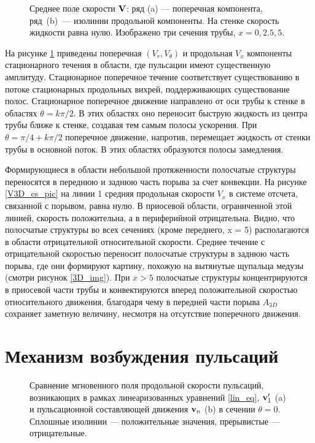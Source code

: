 \begin{figure}[h]
\caption{Среднее поле скорости $\mathbf{V}$: ряд (a) --- поперечная компонента, ряд~(b)~--- изолинии продольной компоненты. На стенке скорость жидкости равна нулю. Изображено три сечения трубы, $x = 0, 2.5, 5$.}
\label{VEL_cs_pic}
\end{figure}

На рисунке \ref{VEL_cs_pic} приведены поперечная $(V_r, V_\theta)$ и продольная $V_x$ компоненты стационарного течения в области, где пульсации имеют существенную амплитуду. Стационарное поперечное течение соответствует существованию в потоке стационарных продольных вихрей, поддерживающих существование полос. Стационарное поперечное движение направлено от оси трубы к стенке в областях $\theta=k\pi/2$. В этих областях оно переносит быструю жидкость из центра трубы ближе к стенке, создавая тем самым полосы ускорения. При $\theta=\pi/4+k\pi/2$ поперечное движение, напротив, перемещает жидкость от стенки трубы в основной поток. В этих областях образуются полосы замедления. 

Формирующиеся в области небольшой протяженности полосчатые структуры переносятся в переднюю и заднюю часть порыва за счет конвекции. На рисунке \ref{V3D_cs_pic} на линии 1 средняя продольная скорости $V_x$ в системе отсчета, связанной с порывом, равна нулю. В приосевой области, ограниченной этой линией, скорость положительна, а в периферийной отрицательна. Видно, что полосчатые структуры во всех сечениях (кроме переднего, x = 5) располагаются в области отрицательной относительной скорости. Среднее течение с отрицательной скоростью переносит полосчатые структуры в заднюю часть порыва, где они формируют картину, похожую на вытянутые щупальца медузы (смотри рисунок \ref{3D_img}). При $x > 5$ полосчатые структуры концентрируются в приосевой части трубы и конвектируются вперед положительной скоростью относительного движения, благодаря чему в передней части порыва $A_{3D}$ сохраняет заметную величину, несмотря на отсутствие поперечного движения.


\section{Механизм возбуждения пульсаций}

\begin{figure}
\caption{Сравнение мгновенного поля продольной скорости пульсаций, возникающих в рамках линеаризованных уравнений \eqref{lin_eq}, $\mathbf{v}'_1$ (a) и пульсационной составляющей движения $\mathbf{v}_n$ (b) в сечении $\theta = 0$. Сплошные изолинии --- положительные значения, прерывистые --- отрицательные.}
\label{lin_ls_cmp_pic}
\end{figure}

